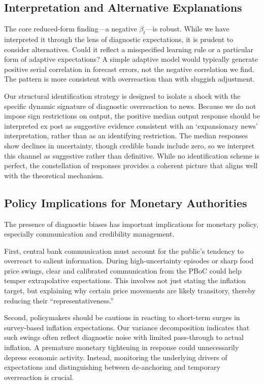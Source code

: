 \documentclass[12pt]{article}
\begin{document}
\subsection{Interpretation and Alternative Explanations}
The core reduced-form finding—a negative $\beta_t$—is robust. While we have interpreted it through the lens of diagnostic expectations, it is prudent to consider alternatives. Could it reflect a misspecified learning rule or a particular form of adaptive expectations? A simple adaptive model would typically generate positive serial correlation in forecast errors, not the negative correlation we find. The pattern is more consistent with overreaction than with sluggish adjustment.

Our structural identification strategy is designed to isolate a shock with the specific dynamic signature of diagnostic overreaction to news. Because we do not impose sign restrictions on output, the positive median output response should be interpreted ex post as suggestive evidence consistent with an `expansionary news' interpretation, rather than as an identifying restriction. The median responses show declines in uncertainty, though credible bands include zero, so we interpret this channel as suggestive rather than definitive. While no identification scheme is perfect, the constellation of responses provides a coherent picture that aligns well with the theoretical mechanism.

\subsection{Policy Implications for Monetary Authorities}
The presence of diagnostic biases has important implications for monetary policy, especially communication and credibility management.

First, central bank communication must account for the public's tendency to overreact to salient information. During high-uncertainty episodes or sharp food price swings, clear and calibrated communication from the PBoC could help temper extrapolative expectations. This involves not just stating the inflation target, but explaining why certain price movements are likely transitory, thereby reducing their ``representativeness.''

Second, policymakers should be cautious in reacting to short-term surges in survey-based inflation expectations. Our variance decomposition indicates that such swings often reflect diagnostic noise with limited pass-through to actual inflation. A premature monetary tightening in response could unnecessarily depress economic activity. Instead, monitoring the underlying drivers of expectations and distinguishing between de-anchoring and temporary overreaction is crucial.
\end{document}

